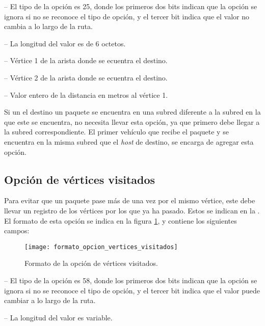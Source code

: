  -- El tipo de la opción es 25, donde los primeros dos
bits indican que la opción se ignora si no se reconoce el tipo de opción, y el
tercer bit indica que el valor no cambia a lo largo de la ruta.

 -- La longitud del valor es de 6 octetos.

 -- Vértice 1 de la arista donde se ecuentra el
destino.

 -- Vértice 2 de la arista donde se ecuentra el
destino.

 -- Valor entero de la distancia en metros al
vértice 1.

Si un el destino un paquete se encuentra en una subred diferente a la subred en
la que este se encuentra, no necesita llevar esta opción, ya que primero debe
llegar a la subred correspondiente. El primer vehículo que recibe el paquete y
se encuentra en la misma subred que el \textit{host} de destino, se encarga de
agregar esta opción.

\subsection{Opción de vértices visitados}
\label{subsec:opcion_de_vertices_visitados}

Para evitar que un paquete pase más de una vez por el mismo vértice, este debe
llevar un registro de los vértices por los que ya ha pasado. Estos se indican en
la . El formato de esta opción se indica
en la figura \ref{fig:formato_opcion_vertices_visitados}, y contiene los
siguientes campos:

\begin{figure}[th!]
\centering
\texttt{[image: formato\_opcion\_vertices\_visitados]}
\decoRule
\caption[Formato de la opción de vértices visitados]{Formato de la opción de
vértices visitados.}
\label{fig:formato_opcion_vertices_visitados}
\end{figure}

 -- El tipo de la opción es 58, donde los primeros dos
bits indican que la opción se ignora si no se reconoce el tipo de opción, y el
tercer bit indica que el valor puede cambiar a lo largo de la ruta.

 -- La longitud del valor es variable.

